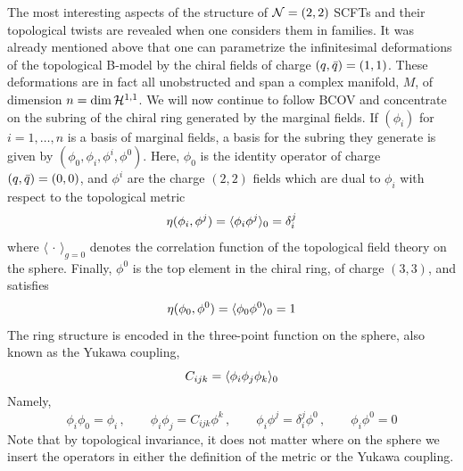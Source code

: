 The most interesting aspects of the structure of ${\cal N}=(2,2)$ SCFTs and their
topological twists are revealed when one considers them in families. It was 
already mentioned above that one can parametrize the infinitesimal deformations
of the topological B-model by the chiral fields of charge $(q,{\bar q})=(1,1)$.
These deformations are in fact all unobstructed and span a complex
manifold, $M$, of dimension $n=\dim {\cal H}^{1,1}$. We will now continue to 
follow BCOV and concentrate on the subring of the chiral ring generated 
by the marginal fields. If $(\phi_i)$ for $i=1,\ldots,n$ is a basis of
marginal fields, a basis for the subring they generate is given by 
$(\phi_0,\phi_i,\phi^i,\phi^0)$. Here, $\phi_0$ is the identity operator
of charge $(q,{\bar q})=(0,0)$, and $\phi^i$ are the charge $(2,2)$ fields 
which are dual to $\phi_i$ with respect to the topological metric
\begin{equation}
\eqlabel{metric1}
\eta(\phi_i,\phi^j) = \langle\phi_i \phi^j\rangle_{0} = \delta_i^j
\end{equation}
where $\langle\,\cdot\,\rangle_{g=0}$ denotes the correlation function of the 
topological field theory on the sphere. Finally, $\phi^0$ is the top element 
in the chiral ring, of charge $(3,3)$, and satisfies
\begin{equation}
\eqlabel{metric2}
\eta(\phi_0,\phi^0) = \langle\phi_0\phi^0\rangle_0 = 1
\end{equation} 
The ring structure is encoded in the three-point function on the sphere, 
also known as the Yukawa coupling,
\begin{equation}
\eqlabel{yukawa}
C_{ijk} = \langle \phi_i\phi_j\phi_k\rangle_0
\end{equation}
Namely,
\begin{equation}
\phi_i\phi_0 = \phi_i\,,\qquad
\phi_i\phi_j = C_{ijk} \phi^k\,,\qquad
\phi_i\phi^j = \delta_i^j\phi^0\,,\qquad
\phi_i\phi^0 = 0
\end{equation}
Note that by topological invariance, it does not matter where on the sphere
we insert the operators in either the definition of the metric or the Yukawa
coupling.


